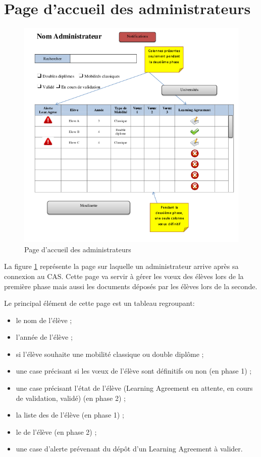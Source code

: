 \section{Page d'accueil des administrateurs}
\label{sec::home_admin}

\begin{figure}[H]
	\includegraphics[scale=0.7]{Admin/HomeAd.png}
	\caption{Page d'accueil des administrateurs}
	\label{fig::hpa1}
\end{figure}

La figure \ref{fig::hpa1} représente la page sur laquelle un administrateur arrive après sa connexion au CAS. Cette page va servir à gérer les vœux des élèves lors de la première phase mais aussi les documents déposés par les élèves lors de la seconde.

Le principal élément de cette page est un tableau regroupant:
\begin{itemize}
 	\item le nom de l'élève ;
 	\item l'année de l'élève ;
 	\item si l'élève souhaite une mobilité classique ou double diplôme ;
 	\item une case précisant si les vœux de l'élève sont définitifs ou non (en phase 1) ;
 	\item une case précisant l'état de l'élève (Learning Agreement en attente, en cours de validation, validé) (en phase 2) ;
 	\item la liste des \voe de l'élève (en phase 1) ;
 	\item le \voe de l'élève (en phase 2) ;
 	\item une case d'alerte prévenant du dépôt d'un Learning Agreement à valider.
 \end{itemize}
 \bigbreak
 

